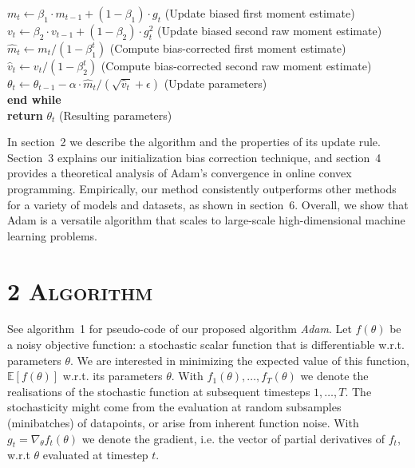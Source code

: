 \documentclass[11pt]{article}
\begin{document}
{{\hspace*{2em}$m_t \leftarrow \beta_1 \cdot m_{t-1} + (1 - \beta_1) \cdot g_t$ \hfill (Update biased first moment estimate)\\
\hspace*{2em}$v_t \leftarrow \beta_2 \cdot v_{t-1} + (1 - \beta_2) \cdot g_t^2$ \hfill (Update biased second raw moment estimate)\\
\hspace*{2em}$\widehat{m}_t \leftarrow m_t / (1 - \beta_1^t)$ \hfill (Compute bias-corrected first moment estimate)\\
\hspace*{2em}$\widehat{v}_t \leftarrow v_t / (1 - \beta_2^t)$ \hfill (Compute bias-corrected second raw moment estimate)\\
\hspace*{2em}$\theta_t \leftarrow \theta_{t-1} - \alpha \cdot \widehat{m}_t / (\sqrt{\widehat{v}_t} + \epsilon)$ \hfill (Update parameters)\\
\hspace*{1em}\textbf{end while}\\
\hspace*{1em}\textbf{return} $\theta_t$ (Resulting parameters)
}}

\vspace{1em}

\noindent
In section~2 we describe the algorithm and the properties of its
update rule. Section~3 explains our initialization bias correction
technique, and section~4 provides a theoretical analysis of Adam's
convergence in online convex programming. Empirically, our method
consistently outperforms other methods for a variety of models and
datasets, as shown in section~6. Overall, we show that Adam is a
versatile algorithm that scales to large-scale high-dimensional
machine learning problems.

\section*{2 \textsc{Algorithm}}

See algorithm~1 for pseudo-code of our proposed algorithm
\emph{Adam}. Let $f(\theta)$ be a noisy objective function: a
stochastic scalar function that is differentiable w.r.t. parameters
$\theta$. We are interested in minimizing the expected value of
this function, $\mathbb{E}[f(\theta)]$ w.r.t. its parameters
$\theta$. With $f_1(\theta), \ldots, f_T(\theta)$ we denote the
realisations of the stochastic function at subsequent timesteps
$1, \ldots, T$. The stochasticity might come from the evaluation
at random subsamples (minibatches) of datapoints, or arise from
inherent function noise. With
$g_t = \nabla_\theta f_t(\theta)$ we denote the gradient, i.e.
the vector of partial derivatives of $f_t$, w.r.t $\theta$
evaluated at timestep $t$.
\end{document}
